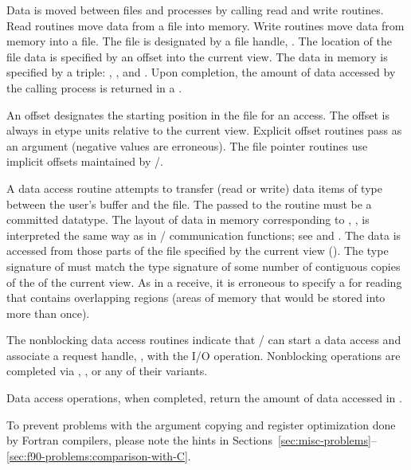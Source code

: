Data is moved between files and processes
by calling read and write routines.
Read routines move data from a file into memory.
Write routines move data from memory into a file.
The file is designated by a file handle, .
The location of the file data is specified by an offset
into the current view.
The data in memory is specified by a triple:
, , and .
Upon completion, the amount of data accessed
by the calling process is returned in a .

An offset designates the starting position in the file for an access.
The offset is always in etype units relative to the current view.
Explicit offset routines pass  as an argument
(negative values are erroneous).
The file pointer routines use implicit offsets maintained by \MPI/.

A data access routine attempts to transfer (read or write)
 data items
of type  between the user's buffer 
and the file.
The  passed to the routine must be 
a committed datatype.
The layout of data in memory corresponding to
, ,  is
interpreted the same way as in 
\MPI/ 
communication functions;
see  and 
. 
The data is accessed
from those parts of the file specified by the current view
().
The type signature of  must match
the type signature of some number of contiguous copies of the 
of the current view.
As in a receive,
it is erroneous to specify a 
for reading that contains overlapping regions
(areas of memory that would be stored into more than once).

The nonblocking data access routines
indicate that \MPI/ can start a data access
and associate a request handle, ,
with the I/O 
operation.
Nonblocking operations are completed via
, , or any of their variants.

Data access operations, when completed,
return the amount of data accessed in .

\begin{users}
To prevent problems with the argument copying and register
optimization done by Fortran compilers, please note the hints in
%
Sections~\ref{sec:misc-problems}--\ref{sec:f90-problems:comparison-with-C}.
\end{users}

